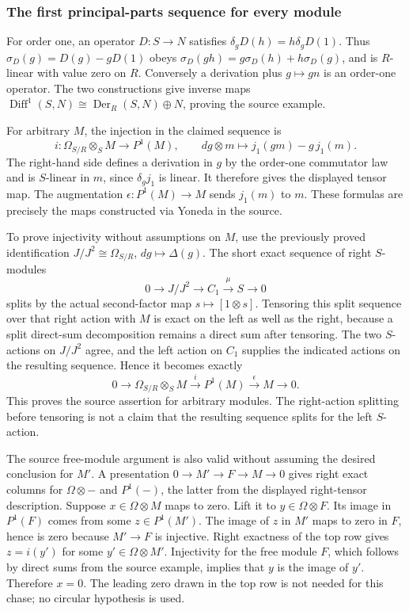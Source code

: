 \subsubsection{The first principal-parts sequence for every module}\label{algebra-proof-043-the-first-principal-parts-sequence-for-every-module}

For order one, an operator \(D:S\to N\) satisfies \(\delta_gD(h)=h\delta_gD(1)\). Thus \(\sigma_D(g)=D(g)-gD(1)\) obeys \(\sigma_D(gh)=g\sigma_D(h)+h\sigma_D(g)\), and is \(R\)-linear with value zero on \(R\). Conversely a derivation plus \(g\mapsto gn\) is an order-one operator. The two constructions give inverse maps \(\operatorname{Diff}^1(S,N)\cong\operatorname{Der}_R(S,N)\oplus N\), proving the source example.

For arbitrary \(M\), the injection in the claimed sequence is \[
i:\Omega_{S/R}\otimes_SM\longrightarrow P^1(M),\qquad
dg\otimes m\longmapsto j_1(gm)-g\,j_1(m).
\] The right-hand side defines a derivation in \(g\) by the order-one commutator law and is \(S\)-linear in \(m\), since \(\delta_gj_1\) is linear. It therefore gives the displayed tensor map. The augmentation \(\epsilon:P^1(M)\to M\) sends \(j_1(m)\) to \(m\). These formulas are precisely the maps constructed via Yoneda in the source.

To prove injectivity without assumptions on \(M\), use the previously proved identification \(J/J^2\cong\Omega_{S/R}\), \(dg\mapsto\Delta(g)\). The short exact sequence of right \(S\)-modules \[
0\longrightarrow J/J^2\longrightarrow C_1\xrightarrow\mu S\longrightarrow0
\] splits by the actual second-factor map \(s\mapsto[1\otimes s]\). Tensoring this split sequence over that right action with \(M\) is exact on the left as well as the right, because a split direct-sum decomposition remains a direct sum after tensoring. The two \(S\)-actions on \(J/J^2\) agree, and the left action on \(C_1\) supplies the indicated actions on the resulting sequence. Hence it becomes exactly \[
0\longrightarrow\Omega_{S/R}\otimes_SM\xrightarrow{i}P^1(M)\xrightarrow{\epsilon}M\longrightarrow0.
\] This proves the source assertion for arbitrary modules. The right-action splitting before tensoring is not a claim that the resulting sequence splits for the left \(S\)-action.

The source free-module argument is also valid without assuming the desired conclusion for \(M'\). A presentation \(0\to M'\to F\to M\to0\) gives right exact columns for \(\Omega\otimes-\) and \(P^1(-)\), the latter from the displayed right-tensor description. Suppose \(x\in\Omega\otimes M\) maps to zero. Lift it to \(y\in\Omega\otimes F\). Its image in \(P^1(F)\) comes from some \(z\in P^1(M')\). The image of \(z\) in \(M'\) maps to zero in \(F\), hence is zero because \(M'\to F\) is injective. Right exactness of the top row gives \(z=i(y')\) for some \(y'\in\Omega\otimes M'\). Injectivity for the free module \(F\), which follows by direct sums from the source example, implies that \(y\) is the image of \(y'\). Therefore \(x=0\). The leading zero drawn in the top row is not needed for this chase; no circular hypothesis is used.

